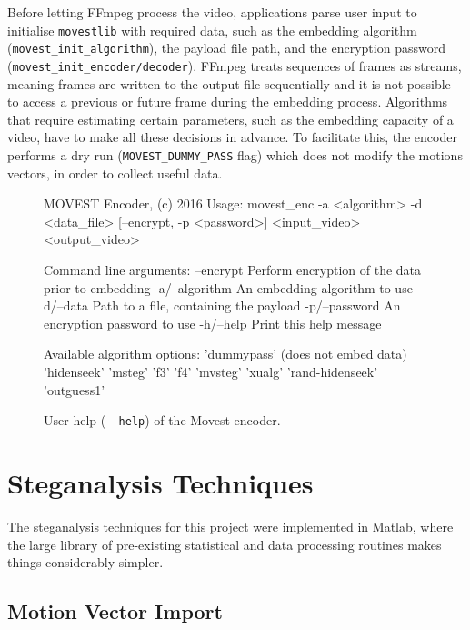 \documentclass[12pt,british,twoside,notitlepage,usenames,dvipsnames,hypens,final]{report}
\numberwithin{equation}{section}
\numberwithin{figure}{section}
\renewenvironment{alltt}{\vspace{-0.6\baselineskip}\begin{oldalltt}}{\end{oldalltt}\vspace{-0.1\baselineskip}}
\begin{document}
Before letting FFmpeg process the video, applications parse user input to initialise \texttt{movestlib} with required data, such as the embedding algorithm (\texttt{movest\_init\_algorithm}), the payload file path, and the encryption password (\texttt{movest\_init\_encoder/decoder}). FFmpeg treats sequences of frames as streams, meaning frames are written to the output file sequentially and it is not possible to access a previous or future frame during the embedding process. Algorithms that require estimating certain parameters, such as the embedding capacity of a video, have to make all these decisions in advance. To facilitate this, the encoder performs a dry run (\texttt{MOVEST\_DUMMY\_PASS} flag) which does not modify the motions vectors, in order to collect useful data.

\begin{figure}[tbh]
\vspace{1em}
\centering
\begin{minipage}{0.9\textwidth}
\begingroup
    \fontsize{10pt}{12pt}\selectfont
\begin{alltt}
MOVEST Encoder, (c) 2016
Usage: movest_enc -a <algorithm> -d <data_file> [--encrypt, -p <password>]
<input_video> <output_video>

Command line arguments:
 --encrypt        Perform encryption of the data prior to embedding
 -a/--algorithm   An embedding algorithm to use
 -d/--data        Path to a file, containing the payload
 -p/--password    An encryption password to use
 -h/--help        Print this help message

Available algorithm options:
 'dummypass' (does not embed data)
 'hidenseek' 'msteg' 'f3' 'f4'
 'mvsteg' 'xualg'
 'rand-hidenseek' 'outguess1'
\end{alltt}
\endgroup
\end{minipage}
\caption{User help (\texttt{-{}-help}) of the Movest encoder.}
\label{fig:encoder-help}
\end{figure}

\section{Steganalysis Techniques}
\label{steg-tech}

The steganalysis techniques for this project were implemented in Matlab, where the large library of pre-existing statistical and data processing routines makes things considerably simpler.

\subsection{Motion Vector Import}
\label{mv-import}
\end{document}
